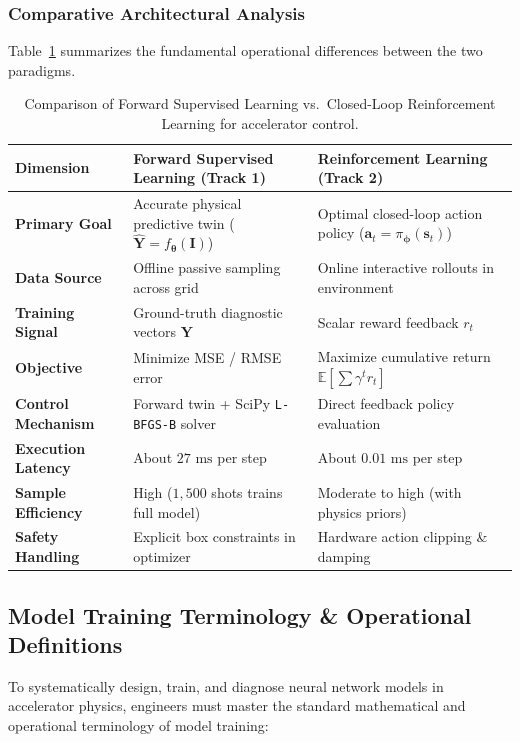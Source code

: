\documentclass[11pt,a4paper]{article}
\begin{document}
\subsubsection{Comparative Architectural Analysis}
Table~\ref{tab:sl_vs_rl} summarizes the fundamental operational differences between the two paradigms.

\begin{table}[h!]
\centering
\small
\begin{tabular}{p{3.5cm} p{5.5cm} p{5.5cm}}
\toprule
\textbf{Dimension} & \textbf{Forward Supervised Learning (Track 1)} & \textbf{Reinforcement Learning (Track 2)} \\
\midrule
\textbf{Primary Goal} & Accurate physical predictive twin ($\hat{\mathbf{Y}} = f_{\boldsymbol{\theta}}(\mathbf{I})$) & Optimal closed-loop action policy ($\mathbf{a}_t = \pi_{\boldsymbol{\phi}}(\mathbf{s}_t)$) \\
\textbf{Data Source} & Offline passive sampling across grid & Online interactive rollouts in environment \\
\textbf{Training Signal} & Ground-truth diagnostic vectors $\mathbf{Y}$ & Scalar reward feedback $r_t$ \\
\textbf{Objective} & Minimize MSE / RMSE error & Maximize cumulative return $\mathbb{E}[\sum \gamma^t r_t]$ \\
\textbf{Control Mechanism} & Forward twin + SciPy \texttt{L-BFGS-B} solver & Direct feedback policy evaluation \\
\textbf{Execution Latency} & About $27\text{ ms}$ per step & About $0.01\text{ ms}$ per step \\
\textbf{Sample Efficiency} & High ($1,500$ shots trains full model) & Moderate to high (with physics priors) \\
\textbf{Safety Handling} & Explicit box constraints in optimizer & Hardware action clipping \& damping \\
\bottomrule
\end{tabular}
\caption{Comparison of Forward Supervised Learning vs.\ Closed-Loop Reinforcement Learning for accelerator control.}
\label{tab:sl_vs_rl}
\end{table}

\subsection{Model Training Terminology \& Operational Definitions}
To systematically design, train, and diagnose neural network models in accelerator physics, engineers must master the standard mathematical and operational terminology of model training:
\end{document}
